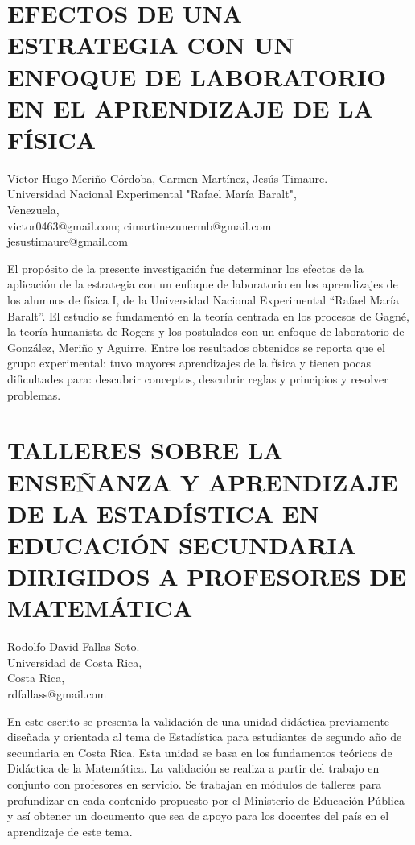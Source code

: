\section{EFECTOS DE UNA ESTRATEGIA CON UN ENFOQUE DE LABORATORIO EN EL APRENDIZAJE
DE LA FÍSICA}

\begin{datos}
Víctor Hugo Meriño Córdoba, Carmen Martínez, Jesús Timaure.\\
Universidad Nacional Experimental "Rafael María Baralt",\\
\hfill  Venezuela, \\
\hfill victor0463@gmail.com; cimartinezunermb@gmail.com\\\hfill  jesustimaure@gmail.com 
\end{datos}El propósito de la presente investigación fue determinar los efectos
de la aplicación de la estrategia con un enfoque de laboratorio en
los aprendizajes de los alumnos de física I, de la Universidad Nacional
Experimental “Rafael María Baralt”. El estudio se fundamentó en la
teoría centrada en los procesos de Gagné, la teoría humanista de Rogers
y los postulados con un enfoque de laboratorio de González, Meriño
y Aguirre. Entre los resultados obtenidos se reporta que el grupo
experimental: tuvo mayores aprendizajes de la física y tienen pocas
dificultades para: descubrir conceptos, descubrir reglas y principios
y resolver problemas.


\section{TALLERES SOBRE LA ENSEÑANZA Y APRENDIZAJE DE LA ESTADÍSTICA EN EDUCACIÓN
SECUNDARIA DIRIGIDOS A PROFESORES DE MATEMÁTICA }

\begin{datos}
Rodolfo David Fallas Soto.\\
Universidad de Costa Rica,\\
\hfill  Costa Rica, \\
\hfill rdfallass@gmail.com
\end{datos}

En este escrito se presenta la validación de una unidad didáctica
previamente diseñada y orientada al tema de Estadística para estudiantes
de segundo año de secundaria en Costa Rica. Esta unidad se basa en
los fundamentos teóricos de Didáctica de la Matemática. La validación
se realiza a partir del trabajo en conjunto con profesores en servicio.
Se trabajan en módulos de talleres para profundizar en cada contenido
propuesto por el Ministerio de Educación Pública y así obtener un
documento que sea de apoyo para los docentes del país en el aprendizaje
de este tema.

